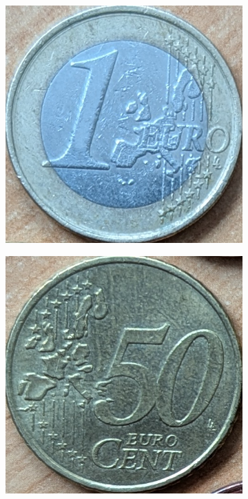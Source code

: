 \begin{figure}[ht]
\begin{subfigure}{0.23\textwidth}
        \includegraphics[width=\linewidth]{../CoinFinder/templates_2/Euro1.png}
    \end{subfigure}
    \begin{subfigure}{0.23\textwidth}
        \includegraphics[width=\linewidth]{../CoinFinder/templates_2/Cent50.png}

\end{subfigure}
\end{figure}

